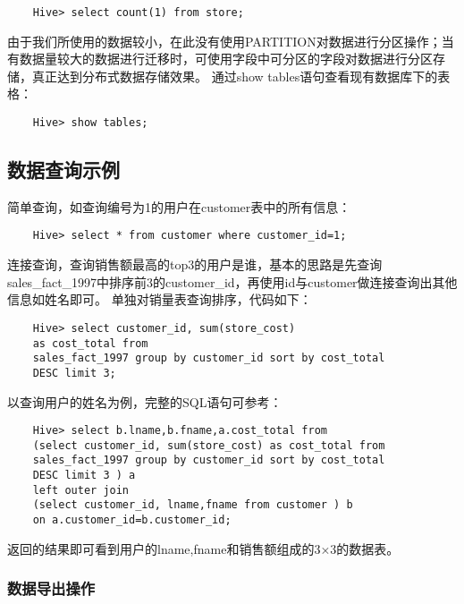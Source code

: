 \begin{lstlisting}
	Hive> select count(1) from store;
\end{lstlisting}

由于我们所使用的数据较小，在此没有使用PARTITION对数据进行分区操作；当有数据量较大的数据进行迁移时，可使用字段中可分区的字段对数据进行分区存储，真正达到分布式数据存储效果。
通过show tables语句查看现有数据库下的表格：

\begin{lstlisting}
	Hive> show tables;
\end{lstlisting}

\subsection{数据查询示例}\label{ux6570ux636eux67e5ux8be2ux793aux4f8b}

简单查询，如查询编号为1的用户在customer表中的所有信息：

\begin{lstlisting}
	Hive> select * from customer where customer_id=1;
\end{lstlisting}

连接查询，查询销售额最高的top3的用户是谁，基本的思路是先查询sales\_fact\_1997中排序前3的customer\_id，再使用id与customer做连接查询出其他信息如姓名即可。
单独对销量表查询排序，代码如下：

\begin{lstlisting}
	Hive> select customer_id, sum(store_cost)
	as cost_total from
	sales_fact_1997 group by customer_id sort by cost_total
	DESC limit 3;
\end{lstlisting}

以查询用户的姓名为例，完整的SQL语句可参考：

\begin{lstlisting}
	Hive> select b.lname,b.fname,a.cost_total from
	(select customer_id, sum(store_cost) as cost_total from
	sales_fact_1997 group by customer_id sort by cost_total
	DESC limit 3 ) a
	left outer join
	(select customer_id, lname,fname from customer ) b
	on a.customer_id=b.customer_id;
\end{lstlisting}

返回的结果即可看到用户的lname,fname和销售额组成的3×3的数据表。

\subsubsection{数据导出操作}\label{ux6570ux636eux5bfcux51faux64cdux4f5c}

